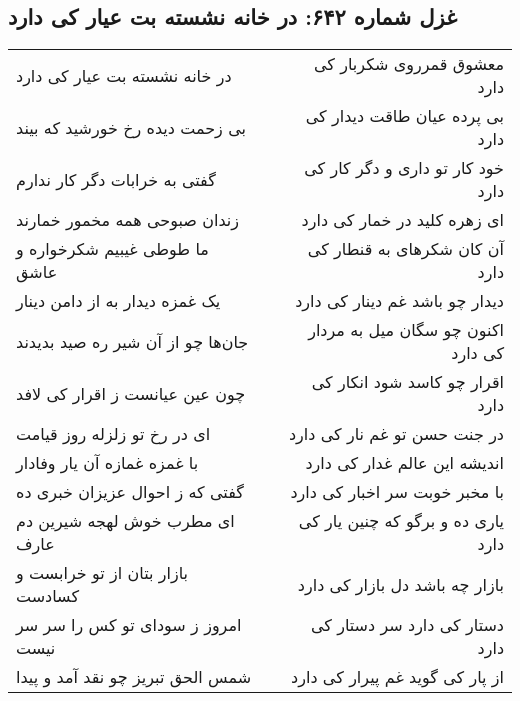 \begin{center}
\section*{غزل شماره ۶۴۲: در خانه نشسته بت عیار کی دارد}
\label{sec:0642}
\begin{longtable}{l p{0.5cm} r}
در خانه نشسته بت عیار کی دارد
&&
معشوق قمرروی شکربار کی دارد
\\
بی زحمت دیده رخ خورشید که بیند
&&
بی پرده عیان طاقت دیدار کی دارد
\\
گفتی به خرابات دگر کار ندارم
&&
خود کار تو داری و دگر کار کی دارد
\\
زندان صبوحی همه مخمور خمارند
&&
ای زهره کلید در خمار کی دارد
\\
ما طوطی غیبیم شکرخواره و عاشق
&&
آن کان شکرهای به قنطار کی دارد
\\
یک غمزه دیدار به از دامن دینار
&&
دیدار چو باشد غم دینار کی دارد
\\
جان‌ها چو از آن شیر ره صید بدیدند
&&
اکنون چو سگان میل به مردار کی دارد
\\
چون عین عیانست ز اقرار کی لافد
&&
اقرار چو کاسد شود انکار کی دارد
\\
ای در رخ تو زلزله روز قیامت
&&
در جنت حسن تو غم نار کی دارد
\\
با غمزه غمازه آن یار وفادار
&&
اندیشه این عالم غدار کی دارد
\\
گفتی که ز احوال عزیزان خبری ده
&&
با مخبر خوبت سر اخبار کی دارد
\\
ای مطرب خوش لهجه شیرین دم عارف
&&
یاری ده و برگو که چنین یار کی دارد
\\
بازار بتان از تو خرابست و کسادست
&&
بازار چه باشد دل بازار کی دارد
\\
امروز ز سودای تو کس را سر سر نیست
&&
دستار کی دارد سر دستار کی دارد
\\
شمس الحق تبریز چو نقد آمد و پیدا
&&
از پار کی گوید غم پیرار کی دارد
\\
\end{longtable}
\end{center}
